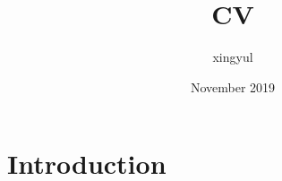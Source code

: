 \documentclass{article}
\title{CV}
\author{xingyul }
\date{November 2019}
\begin{document}
\maketitle

\section{Introduction}
\end{document}
